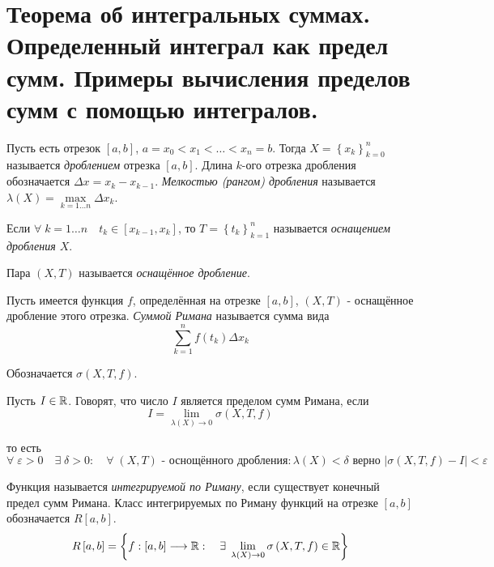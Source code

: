 \documentclass[../main.tex]{subfiles}
\begin{document}
\newpage
\section{Теорема об интегральных суммах. Определенный интеграл как предел сумм. Примеры вычисления пределов сумм с помощью интегралов.}
Пусть есть отрезок \( \left[ a,b\right]\), \( a=x_0<x_1< \ldots <x_n=b\). Тогда \( X=\left\{ x_k\right\}_{k=0}^n\) называется \emph{дроблением} отрезка \( \left[ a,b\right]\). 
Длина \( k\)-ого отрезка дробления обозначается \( \Delta x=x_k-x_{k-1}\). \emph{Мелкостью (рангом) дробления} называется \( \lambda \left( X\right)= \max\limits_{ k=1 \ldots n} \Delta x_k\). 

Если \( \forall \; k=1 \ldots n\quad t_k \in \left[ x_{k-1}, x_k\right]\), то \( T=\left\{ t_k\right\}_{k=1}^n\) называется \emph{оснащением дробления \( X\)}. 

Пара \( \left( X,T\right)\) называется \emph{оснащённое дробление}. 

Пусть имеется функция \( f\), определённая на отрезке \( \left[ a,b\right]\), \( \left( X,T\right)\) - оснащённое дробление этого отрезка. \emph{Суммой Римана} называется сумма вида 
\[ \sum\limits_{ k=1}^{ n} f\left( t_k\right) \Delta x_k\]

Обозначается \( \sigma\left( X,T,f\right)\).

Пусть \( I \in \mathbb{R} \). Говорят, что число \( I\) является пределом сумм Римана, если 
\[ I= \lim\limits_{ \lambda \left( X\right)\rightarrow 0} \sigma\left( X, T, f\right)\]

то есть 
\[ \forall \; \varepsilon >0\quad  \exists \; \delta >0:\quad \forall \; \left( X,T\right) \text{ - оснощённого дробления}: \lambda \left( X\right)< \delta \text{ верно } \left| \sigma\left( X,T,f\right)-I\right|< \varepsilon \]

Функция называется \emph{интегрируемой по Риману}, если существует конечный предел сумм Римана. Класс интегрируемых по Риману функций на отрезке \( \left[ a,b\right]\) обозначается \( R \left[ a,b\right]\).
\[ R\left[ a,b\right]=\left\{ f:\left[ a,b\right] \longrightarrow \mathbb{R} :\quad \exists \; \lim\limits_{ \lambda \left( X\right)\rightarrow0} \sigma\left( X,T,f\right) \in \mathbb{R} \right\}\]
\end{document}
